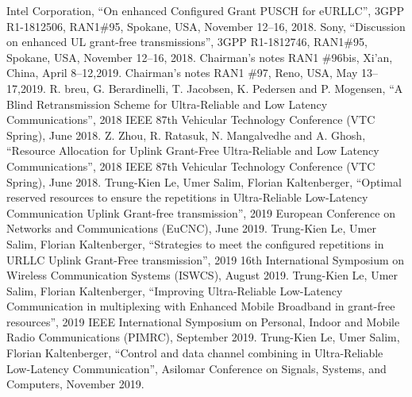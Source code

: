 \documentclass{report}
\begin{document}
\begin{thebibliography}{9}
 Intel Corporation, ``On enhanced Configured Grant PUSCH for eURLLC'', 3GPP R1-1812506, RAN1\#95, Spokane, USA, November 12--16, 2018.
 Sony, ``Discussion on enhanced UL grant-free transmissions'', 3GPP R1-1812746, RAN1\#95, Spokane, USA, November 12--16, 2018.
 Chairman's notes RAN1 \#96bis, Xi'an, China, April 8--12,2019.
 Chairman's notes RAN1 \#97, Reno, USA, May 13--17,2019.
 R. breu, G. Berardinelli, T. Jacobsen, K. Pedersen and P. Mogensen, ``A Blind Retransmission Scheme for Ultra-Reliable and Low Latency Communications'', 2018 IEEE 87th Vehicular Technology Conference (VTC Spring), June 2018.
 Z. Zhou, R. Ratasuk, N. Mangalvedhe and A. Ghosh, ``Resource Allocation for Uplink Grant-Free Ultra-Reliable and Low Latency Communications'', 2018 IEEE 87th Vehicular Technology Conference (VTC Spring), June 2018.
 Trung-Kien Le, Umer Salim, Florian Kaltenberger, ``Optimal reserved resources to ensure the repetitions in Ultra-Reliable Low-Latency Communication Uplink Grant-free transmission'',  2019 European Conference on Networks and Communications (EuCNC), June 2019.
 Trung-Kien Le, Umer Salim, Florian Kaltenberger, ``Strategies to meet the configured repetitions in URLLC Uplink Grant-Free transmission'',  2019 16th International Symposium on Wireless Communication Systems (ISWCS), August 2019.
 Trung-Kien Le, Umer Salim, Florian Kaltenberger, ``Improving Ultra-Reliable Low-Latency Communication in multiplexing with Enhanced Mobile Broadband in grant-free resources'', 2019 IEEE International Symposium on Personal, Indoor and Mobile Radio Communications (PIMRC), September 2019.
 Trung-Kien Le, Umer Salim, Florian Kaltenberger, ``Control and data channel combining in Ultra-Reliable Low-Latency Communication'', Asilomar Conference on Signals, Systems, and Computers, November 2019.
\end{thebibliography}
\clearpage
\end{document}
